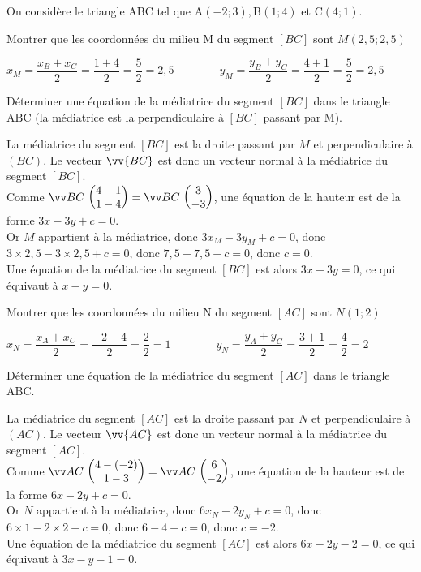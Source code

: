 \documentclass[12pt,a4paper]{article}  %
\begin{document}
On considère le triangle $\mathrm{ABC}$ tel que $\mathrm{A}(-2 ;3), \mathrm{B}(1 ; 4)$ et $\mathrm{C}(4 ; 1)$.
\begin{enumMet}
    \item Montrer que les coordonnées du milieu M du segment $[BC]$ sont $M(2,5;2,5)$\\
    \begin{corrBox}
        $x_M=\dfrac{x_B+x_C}{2}=\dfrac{1+4}{2}=\dfrac{5}{2}=2,5\quad \quad \quad \quad y_M=\dfrac{y_B+y_C}{2}=\dfrac{4+1}{2}=\dfrac{5}{2}=2,5$
    \end{corrBox}
    \item Déterminer une équation de la médiatrice  du segment $[BC]$ dans le triangle $\mathrm{ABC}$ (la médiatrice est la perpendiculaire à $[BC]$ passant par M).\\
    \begin{corrBox}
        La médiatrice du segment $[BC]$ est la droite passant par $M$ et perpendiculaire à $(BC)$. Le vecteur $\vv{BC}$ est donc un vecteur normal à la médiatrice du segment $[BC]$.\\
        Comme $\Coord{BC}{4-1}{1-4}=\Coord{BC}{3}{-3}$, une équation de la hauteur est de la forme $3x-3y+c=0$.\\
        Or $M$ appartient à la médiatrice, donc $3x_{M}-3y_{M}+c=0$, donc $3\times 2,5-3\times2,5+c=0$, donc $7,5-7,5+c=0$, donc $c=0$.\\
        Une équation de la médiatrice du segment $[BC]$ est alors $3x-3y=0$, ce qui équivaut à $x-y=0$.
    \end{corrBox}
    \item Montrer que les coordonnées du milieu N du segment $[AC]$ sont $N(1;2)$\\
    \begin{corrBox}
        $x_N=\dfrac{x_A+x_C}{2}=\dfrac{-2+4}{2}=\dfrac{2}{2}=1\quad \quad \quad \quad y_N=\dfrac{y_A+y_C}{2}=\dfrac{3+1}{2}=\dfrac{4}{2}=2$
    \end{corrBox}
    \item Déterminer une équation de la médiatrice  du segment $[AC]$ dans le triangle $\mathrm{ABC}$.\\
    \begin{corrBox}
        La médiatrice du segment $[AC]$ est la droite passant par $N$ et perpendiculaire à $(A C)$. Le vecteur $\vv{A C}$ est donc un vecteur normal à la médiatrice du segment $[AC]$.\\
        Comme $\Coord{AC}{4-(-2)}{1-3}=\Coord{AC}{6}{-2}$, une équation de la hauteur est de la forme $6x-2y+c=0$.\\
        Or $N$ appartient à la médiatrice, donc $6x_{N}-2y_{N}+c=0$, donc $6\times 1-2\times2+c=0$, donc $6-4+c=0$, donc $c=-2$.\\
        Une équation de la médiatrice du segment $[AC]$ est alors $6x-2y-2=0$, ce qui équivaut à $3x-y-1=0$.
    \end{corrBox}
    

\end{enumMet}
\end{document}

